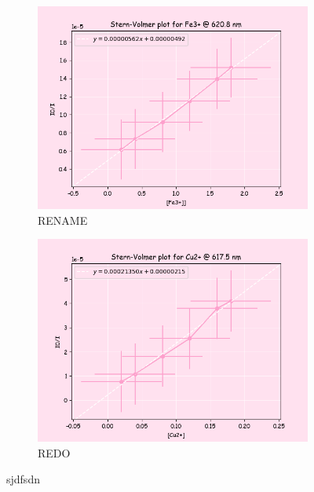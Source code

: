 \begin{figure}[H]
     \centering
     \begin{subfigure}[b]{0.7\textwidth}
         \centering
         \includegraphics[width=\textwidth]{part1_q1_Fe.png}
         \caption{RENAME}
         \label{fig:part1_fe}
     \end{subfigure}
     \hfill
     \begin{subfigure}[b]{0.7\textwidth}
         \centering
         \includegraphics[width=\textwidth]{part1_q1_Cu.png}
         \caption{REDO}
         \label{fig:part1_q1_Cu}
     \end{subfigure}
     \caption{sjdfsdn}
     \label{fig:stern_volmers}
\end{figure}